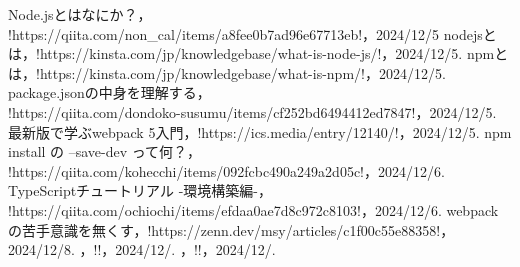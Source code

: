 \documentclass[autodetect-engine,dvi=dvipdfmx,ja=standard,
               a4j,11pt]{bxjsarticle}
\begin{document}
\begin{thebibliography}{99}
    Node.jsとはなにか？， \spverb!https://qiita.com/non_cal/items/a8fee0b7ad96e67713eb!，2024/12/5
    nodejsとは，\spverb!https://kinsta.com/jp/knowledgebase/what-is-node-js/!，2024/12/5.
    npmとは，\spverb!https://kinsta.com/jp/knowledgebase/what-is-npm/!，2024/12/5.
    package.jsonの中身を理解する，\\ \spverb!https://qiita.com/dondoko-susumu/items/cf252bd6494412ed7847!，2024/12/5.
    最新版で学ぶwebpack 5入門，\spverb!https://ics.media/entry/12140/!，2024/12/5.
    npm install の --save-dev って何？，\\ \spverb!https://qiita.com/kohecchi/items/092fcbc490a249a2d05c!，2024/12/6.
    TypeScriptチュートリアル -環境構築編-，\\ \spverb!https://qiita.com/ochiochi/items/efdaa0ae7d8c972c8103!，2024/12/6.
    webpackの苦手意識を無くす，\spverb!https://zenn.dev/msy/articles/c1f00c55e88358!，2024/12/8.
   ，\spverb!!，2024/12/.
   ，\spverb!!，2024/12/.
  
  
\end{thebibliography}
\end{document}
